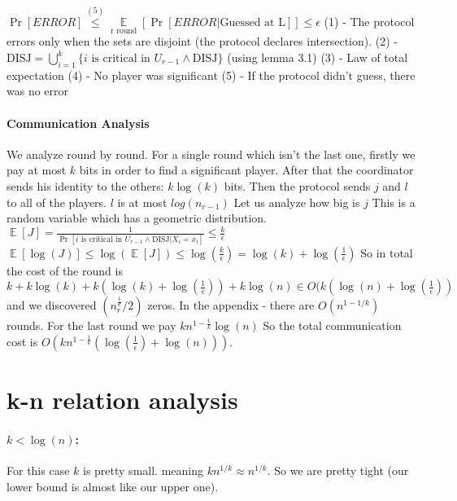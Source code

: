 \documentclass{article}
\theoremstyle{plain}
\begin{document}
$\Pr[ERROR] \overset{(5)}{\leq} \underset{\text{r round}}{\mathop{\mathbb{E}}} [\Pr[ERROR | \text{Guessed at L}] ] \leq \epsilon $ \newline
(1) - The protocol errors only when the sets are disjoint (the protocol declares intersection). \newline
(2) - $  \text{DISJ} = \bigcup_{i=1}^{k}\{\text{$i$ is critical in $U_{r-1}$} \land \text{DISJ} \} $ (using lemma 3.1) \newline
(3) - Law of total expectation \newline
(4) - No player was significant \newline
(5) - If the protocol didn't guess, there was no error
\paragraph{Communication Analysis}
We analyze round by round. \newline
For a single round which isn't the last one, firstly we pay at most $k$ bits in order to find a significant player. After that the coordinator sends his identity to the others: $k\log(k)$ bits. Then the protocol sends $j$ and $l$ to all of the players. $l$ is at most $log(n_{r-1})$
Let us analyze how big is $j$ \newline
This is a random variable which has a geometric distribution. \newline
$ \mathop{\mathbb{E}} [J] = \frac{1}{\Pr[\text{$i$ is critical in $U_{r-1}$} \land \text{DISJ} | X_i = x_i]} \leq \frac{k}{\epsilon}$ \newline
$\mathop{\mathbb{E}} [\log(J)] \leq \log(\mathop{\mathbb{E}} [J]) \leq \log(\frac{k}{\epsilon}) = \log(k) + \log(\frac{1}{\epsilon})$ \newline
So in total the cost of the round is $k + k\log(k) + k(\log(k) + \log(\frac{1}{\epsilon})) + k\log(n) \in O(k(\log(n) + \log(\frac{1}{\epsilon}))$ and we discovered $(n_r^{\frac{1}{k}}/2)$ zeros. \newline
In the appendix - there are $O(n^{1-1/k})$ rounds.
For the last round we pay $kn^{1-\frac{1}{k}} \log(n)$ \newline
So the total communication cost is  $O(kn^{1-\frac{1}{k}}(\log(\frac{1}{\epsilon}) + \log(n)))$.
\section{k-n relation analysis}
\paragraph{$k < \log(n)$:}
For this case $k$ is pretty small. meaning $kn^{1/k} \approx n^{1/k}$. So we are pretty tight (our lower bound is almost like our upper one).
\end{document}
